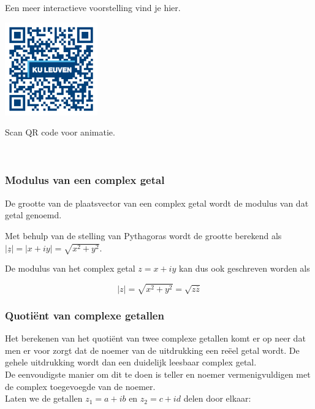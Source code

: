 Een meer interactieve voorstelling vind je hier.\\

\begin{minipage}{.25\linewidth}
	\raggedright
	\includegraphics[width=4cm]{3_gonio_complexe_getallen/inputs/QR_Code_ANIMATIE3_module3new}
\end{minipage}
\begin{minipage}{.7\linewidth}
	Scan QR code voor animatie.
\end{minipage}  \\


\subsubsection{Modulus van een complex getal}

\begin{definitie}
	De grootte van de plaatsvector van een complex getal wordt de modulus van dat getal genoemd. 

\end{definitie}
Met behulp van de stelling van Pythagoras wordt de grootte berekend als $|\underline{z}|=|x+iy|=\sqrt{x^2 +y^2}$.\\
\begin{eigenschap}
	De modulus van het complex getal $z=x+iy$ kan dus ook geschreven worden als

\begin{framed}
\[ |z|=\sqrt{x^2 +y^2}=\sqrt{z \overline{z}}  \]
\end{framed}

\end{eigenschap}

\subsubsection{Quoti\"{e}nt van complexe getallen}

Het berekenen van het quoti\"{e}nt van twee complexe getallen komt er op neer dat men er voor zorgt dat de noemer van de uitdrukking een re\"{e}el getal wordt. De gehele uitdrukking wordt dan een duidelijk leesbaar complex getal.\\
De eenvoudigste manier om dit te doen is teller en noemer vermenigvuldigen met de complex toegevoegde van de noemer.\\
Laten we de getallen $z_{1}=a+ib$ en $z_{2}=c+id$ delen door elkaar:

